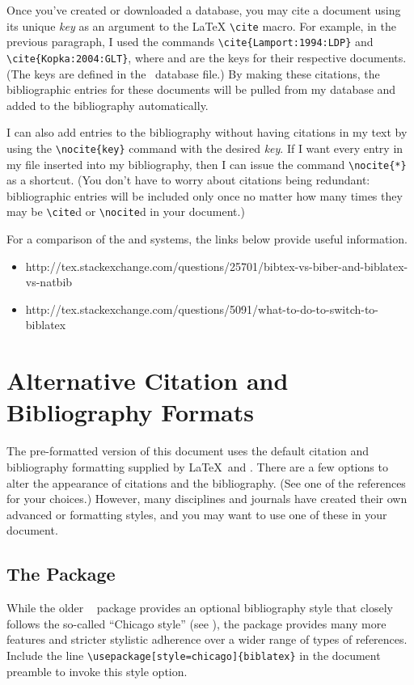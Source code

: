 Once you've created or downloaded a \BibLaTeX{} database, you may cite a
document using its unique \textit{key} as an argument to
the \LaTeX{} \verb|\cite| macro.  For example, in the previous
paragraph, I used the commands \verb|\cite{Lamport:1994:LDP}| and
\verb|\cite{Kopka:2004:GLT}|, where  and
 are the keys for their respective documents.
(The keys are defined in the \BibLaTeX\ database file.)  By making these
citations, the bibliographic entries for these documents will be
pulled from my \BibLaTeX{} database and added to the bibliography
automatically.

I can also add entries to the bibliography without having citations in
my text by using the \verb|\nocite{key}| command with the
desired \textit{key}.  If I want every entry in my \BibLaTeX{} file
inserted into my bibliography, then I can issue the
command \verb|\nocite{*}| as a shortcut.  (You don't have to worry
about citations being redundant: bibliographic entries will be
included only once no matter how many times they may be \verb|\cite|d
or \verb|\nocite|d in your document.)

For a comparison of the \BibTeX{} and \BibLaTeX{} systems, the
links below provide useful information.
\begin{itemize}\small
\item \textsf{http://tex.stackexchange.com/questions/25701/bibtex-vs-biber-and-biblatex-vs-natbib}
\item \textsf{http://tex.stackexchange.com/questions/5091/what-to-do-to-switch-to-biblatex}
\end{itemize}

\section{Alternative Citation and Bibliography Formats}
The pre-formatted version of this document uses the default citation
and bibliography formatting supplied by \LaTeX\ and \BibLaTeX.  There
are a few options to alter the appearance of citations and the
bibliography.  (See one of the references for your choices.)  However,
many disciplines and journals have created their own
advanced \BibTeX{} or \BibLaTeX{} formatting styles, and you may want
to use one of these in your document.

\subsection{The  Package}
While the older \BibTeX\  package provides an optional
bibliography style that closely follows the so-called ``Chicago
style'' (see \cite{Anonymous:1993:CMS}),
the \BibLaTeX{}  package provides many more
features and stricter stylistic adherence over a wider range of types
of references. Include the
line \verb|\usepackage[style=chicago]{biblatex}| in the document
preamble to invoke this style option.

